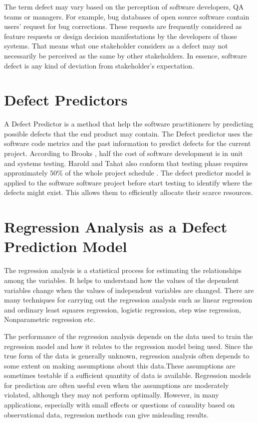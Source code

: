 \documentclass[12pt]{report}
\begin{document}
The term defect may vary based on the perception of software developers, QA teams or managers. For example, bug databases of open source software contain users' request for bug corrections. These requests are frequently considered as feature requests or design decision manifestations by the developers of those systems. That means what one stakeholder considers as a defect may not necessarily be perceived as the same by other stakeholders. In essence, software defect is any kind of deviation from stakeholder's expectation.

\section{Defect Predictors}
\label{defination_defect_Predictors}
A Defect Predictor is a method that help the software practitioners by predicting possible defects that the end product may contain. The Defect predictor uses the software code metrics and the past information to predict defects for the current project. According to Brooks \cite{brooks1995mythical}, half the cost of software development is in unit and systems testing. Harold and Tahat also conform that testing phase requires approximately $50\%$ of the whole project schedule \cite{harrold2000testing,tahat2001requirement}. The defect predictor model is applied to the software software project before start testing to identify where the defects might exist. This allows them to efficiently allocate their scarce resources. 

\section{Regression Analysis as a Defect Prediction Model}
\label{definition_Defect_Prediction_Model}
The regression analysis is a statistical process for estimating the relationships among the variables. It helps to understand how the values of the dependent variables change when the values of independent variables are changed. There are many techniques for carrying out the regression analysis such as linear regression and ordinary least squares regression, logistic regression, step wise regression, Nonparametric regression etc. 

The performance of the regression analysis depends on the data used to train the regression model and how it relates to the regression model being used. Since the true form of the data is generally unknown, regression analysis often depends to some extent on making assumptions about this data.These assumptions are sometimes testable if a sufficient quantity of data is available. Regression models for prediction are often useful even when the assumptions are moderately violated, although they may not perform optimally. However, in many applications, especially with small effects or questions of causality based on observational data, regression methods can give misleading results.
\end{document}

